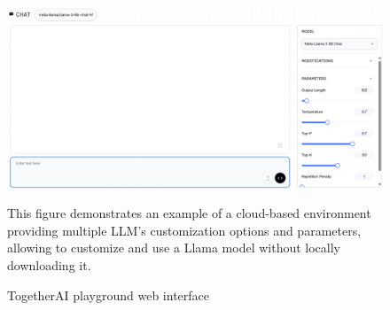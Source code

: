 \begin{figure}[H]
    \centering
    \includegraphics[width=\linewidth]{./figures/togetherai-playground.png}
    \caption{TogetherAI playground web interface \cite{togetheraipg}}
    \begin{flushleft}
        This figure demonstrates an example of a cloud-based environment providing multiple LLM's customization options and parameters, allowing to customize and use a Llama model without locally downloading it.
    \end{flushleft}
\end{figure}
